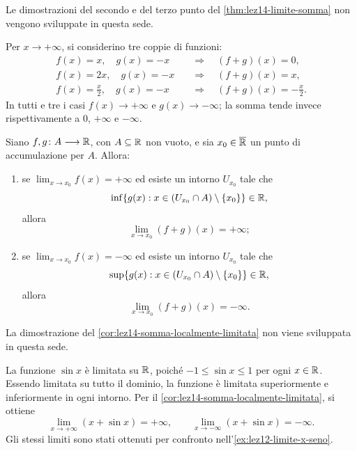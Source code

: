 Le dimostrazioni del secondo e del terzo punto del
\cref{thm:lez14-limite-somma} non vengono sviluppate in questa sede.

\begin{example}
\label{ex:lez14-somma-indeterminata}
Per \(x\to+\infty\), si considerino tre coppie di funzioni:
\[
\begin{aligned}
  f(x)=x,\quad g(x)=-x
    &\quad\Longrightarrow\quad (f+g)(x)=0,\\
  f(x)=2x,\quad g(x)=-x
    &\quad\Longrightarrow\quad (f+g)(x)=x,\\
  f(x)=\frac{x}{2},\quad g(x)=-x
    &\quad\Longrightarrow\quad (f+g)(x)=-\frac{x}{2}.
\end{aligned}
\]
In tutti e tre i casi \(f(x)\to+\infty\) e
\(g(x)\to-\infty\); la somma tende invece rispettivamente
a \(0\), \(+\infty\) e \(-\infty\).
\end{example}

\begin{corollary}
\label{cor:lez14-somma-localmente-limitata}
Siano \(f,g\colon A\longrightarrow\mathbb{R}\), con
\(A\subseteq\mathbb{R}\) non vuoto, e sia
\(x_0\in\overline{\mathbb{R}}\) un punto di accumulazione per \(A\).
Allora:
\begin{enumerate}
  \item se \(\displaystyle\lim_{x\to x_0}f(x)=+\infty\)
  ed esiste un intorno \(U_{x_0}\) tale che
  \[
    \inf\{g(x):x\in(U_{x_0}\cap A)\setminus\{x_0\}\}
    \in\mathbb{R},
  \]
  allora
  \[
    \lim_{x\to x_0}(f+g)(x)=+\infty;
  \]

  \item se \(\displaystyle\lim_{x\to x_0}f(x)=-\infty\)
  ed esiste un intorno \(U_{x_0}\) tale che
  \[
    \sup\{g(x):x\in(U_{x_0}\cap A)\setminus\{x_0\}\}
    \in\mathbb{R},
  \]
  allora
  \[
    \lim_{x\to x_0}(f+g)(x)=-\infty.
  \]
\end{enumerate}
\end{corollary}

La dimostrazione del \cref{cor:lez14-somma-localmente-limitata}
non viene sviluppata in questa sede.

\begin{example}
\label{ex:lez14-somma-seno}
La funzione \(\sin x\) è limitata su \(\mathbb{R}\), poiché
\(-1\le\sin x\le1\) per ogni \(x\in\mathbb{R}\).
Essendo limitata su tutto il dominio, la funzione è
limitata superiormente e inferiormente in ogni intorno.
Per il \cref{cor:lez14-somma-localmente-limitata}, si ottiene
\[
  \lim_{x\to+\infty}(x+\sin x)=+\infty,
  \qquad
  \lim_{x\to-\infty}(x+\sin x)=-\infty.
\]
Gli stessi limiti sono stati ottenuti per confronto
nell'\cref{ex:lez12-limite-x-seno}.
\end{example}

